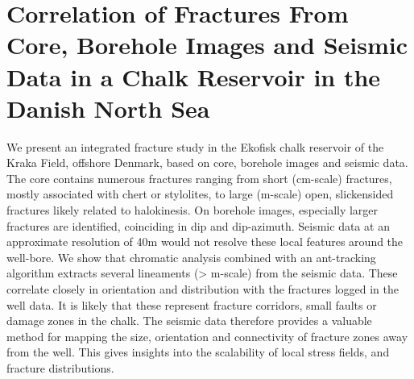 \chapter{Correlation of Fractures From Core, Borehole Images and Seismic Data in a Chalk Reservoir in the Danish North Sea}

We present an integrated fracture study in the Ekofisk chalk reservoir of the Kraka Field, offshore Denmark, based on core, borehole images and seismic data. The core contains numerous fractures ranging from short (cm-scale) fractures, mostly associated with chert or stylolites, to large (m-scale) open, slickensided fractures likely related to halokinesis. On borehole images, especially larger fractures are identified, coinciding in dip and dip-azimuth. Seismic data at an approximate resolution of 40m would not resolve these local features around the well-bore. We show that chromatic analysis combined with an ant-tracking algorithm extracts several lineaments (> m-scale) from the seismic data. These correlate closely in orientation and distribution with the fractures logged in the well data. It is likely that these represent fracture corridors, small faults or damage zones in the chalk. The seismic data therefore provides a valuable method for mapping the size, orientation and connectivity of fracture zones away from the well. This gives insights into the scalability of local stress fields, and fracture distributions. 

{\vfill\hfill\newline{}}



